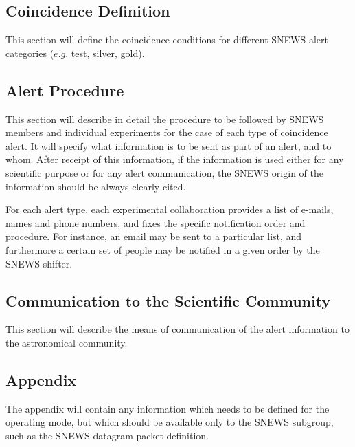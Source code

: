 \documentclass{article}
\begin{document}
\subsection{Coincidence Definition}

This section will define the coincidence conditions for different
SNEWS alert categories ($e.g.$ test, silver, gold).

\subsection{Alert Procedure}

This section will describe in detail the procedure to be followed by
SNEWS members and individual experiments for the case of each type of
coincidence alert.  It will specify what information is to be sent as
part of an alert, and to whom.  After receipt of this information, if
the information is used either for any scientific purpose or for any
alert communication, the SNEWS origin of the information should be
always clearly cited.

For each alert type, each experimental collaboration 
provides a list of e-mails, names and phone numbers, and fixes
the specific notification order and procedure. For instance, an email may
be sent to a particular list, and furthermore a certain set of
people may be notified in a given order by the SNEWS shifter.

\subsection{Communication to the Scientific Community}

This section will describe the means of communication
of the alert information to the astronomical community.

\subsection{Appendix}

The appendix will contain any information which needs to be defined
for the operating mode, but which should be available only
to the SNEWS subgroup, such as the SNEWS datagram packet definition.
\end{document}

